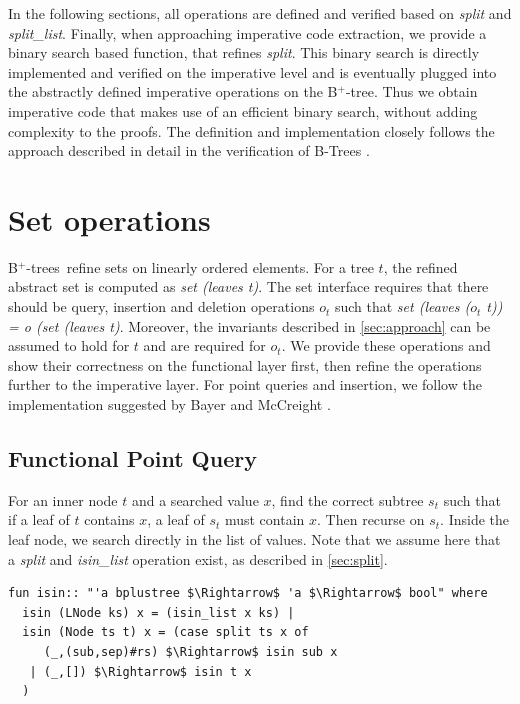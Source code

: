 \documentclass[a4paper,UKenglish,cleveref, autoref, thm-restate]{lipics-v2021}
\newcommand{\btree}{B$^+$-tree}
\newcommand{\btrees}{B$^+$-trees}
\begin{document}
In the following sections, all operations are defined and verified
based on \emph{split} and \emph{split\_list}.
Finally, when approaching imperative code extraction,
we provide a binary search based function, that refines \emph{split}.
This binary search is directly implemented and verified on the imperative
level and is eventually plugged into the abstractly defined
imperative operations on the \btree.
Thus we obtain imperative code that makes use of an efficient
binary search, without adding complexity to the proofs.
The definition and implementation closely follows
the approach described in detail in the
verification of B-Trees \cite{DBLP:journals/afp/Mundler21}.


\section{Set operations}
\label{sec:set}

\btrees\ refine sets on linearly ordered elements.
For a tree $t$, the refined abstract set is computed as \emph{set (leaves t)}.
The set interface requires that there should be query, insertion and deletion
operations $o_t$ such that \emph{set (leaves ($o_t$ t)) = o (set (leaves t)}.
Moreover, the invariants described in \autoref{sec:approach}
can be assumed to hold for $t$ and are required for $o_t$.
We provide these operations and show their correctness on the functional
layer first, then refine the operations further to the imperative
layer.
For point queries and insertion, we follow the implementation
suggested by Bayer and McCreight \cite{DBLP:journals/acta/BayerM72}.

\subsection{Functional Point Query}
\label{sec:functional_pq}

For an inner node $t$ and a searched value $x$, find the correct subtree $s_t$
such that if a leaf of $t$ contains $x$, a leaf of $s_t$ must contain $x$.
Then recurse on $s_t$.
Inside the leaf node, we search directly in the list of values.
Note that we assume here that a \textit{split} and \textit{isin\_list} operation exist,
as described in \autoref{sec:split}.

\begin{lstlisting}[mathescape=true, language=Isabelle,label=lst:isin-def]
fun isin:: "'a bplustree $\Rightarrow$ 'a $\Rightarrow$ bool" where
  isin (LNode ks) x = (isin_list x ks) |
  isin (Node ts t) x = (case split ts x of
     (_,(sub,sep)#rs) $\Rightarrow$ isin sub x
   | (_,[]) $\Rightarrow$ isin t x
  )
\end{lstlisting}
\end{document}
